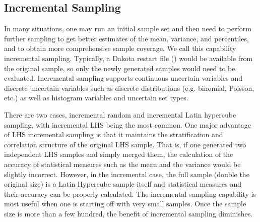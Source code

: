 \subsection{Incremental Sampling}\label{uq:incremental}

In many situations, one may run an initial sample set and then need to
perform further sampling to get better estimates of the mean,
variance, and percentiles, and to obtain more comprehensive sample
coverage. We call this capability incremental sampling.  Typically, a
Dakota restart file () would be available from the
original sample, so only the newly generated samples would need to be
evaluated.  Incremental sampling supports continuous uncertain
variables and discrete uncertain variables such as discrete
distributions (e.g.  binomial, Poisson, etc.) as well as histogram
variables and uncertain set types.

There are two cases, incremental random and incremental Latin
hypercube sampling, with incremental LHS being the most common.  One
major advantage of LHS incremental sampling is that it maintains the
stratification and correlation structure of the original LHS sample.
That is, if one generated two independent LHS samples and simply
merged them, the calculation of the accuracy of statistical measures
such as the mean and the variance would be slightly
incorrect. However, in the incremental case, the full sample (double
the original size) is a Latin Hypercube sample itself and statistical
measures and their accuracy can be properly calculated. The
incremental sampling capability is most useful when one is starting
off with very small samples. Once the sample size is more than a few
hundred, the benefit of incremental sampling diminishes.

